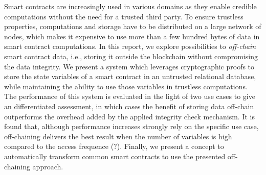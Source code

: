 Smart contracts are increasingly used in various domains as they enable credible computations without the need for a trusted third party.
To ensure trustless properties, computations and storage have to be distributed on a large network of nodes, which makes it expensive to use more than a few hundred bytes of data in smart contract computations.
In this report, we explore possibilities to \emph{off-chain} smart contract data, i.e., storing it outside the blockchain without compromising the data integrity.
We present a system which leverages cryptographic proofs to store the state variables of a smart contract in an untrusted relational database, while maintaining the ability to use those variables in trustless computations.
The performance of this system is evaluated in the light of two use cases to give an differentiated assessment, in which cases the benefit of storing data off-chain outperforms the overhead added by the applied integrity check mechanism.
It is found that, although performance increases strongly rely on the specific use case, off-chaining delivers the best result when the number of variables is high compared to the access frequence (?).
Finally, we present a concept to automatically transform common smart contracts to use the presented off-chaining approach.
